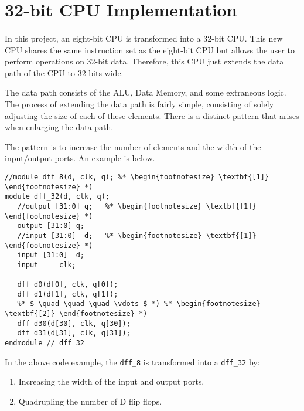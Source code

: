 \documentclass[11pt,letterpaper,final]{article}
\begin{document}
\section{ 32-bit CPU Implementation }
\paragraph{}
In this project, an eight-bit CPU is transformed into a 32-bit CPU. This new CPU
shares the same instruction set as the eight-bit CPU but allows the user to 
perform operations on 32-bit data.  Therefore, this CPU just extends the data 
path of the CPU to 32 bits wide.

The data path consists of the ALU, Data Memory, and some extraneous logic.  The 
process of extending the data path is fairly simple, consisting of solely 
adjusting the size of each of these elements.  There is a distinct pattern that 
arises when enlarging the data path. 

The pattern is to increase the number of elements and the width of the input/output 
ports. An example is below.
\begin{center}
\begin{lstlisting}
//module dff_8(d, clk, q); %* \begin{footnotesize} \textbf{[1]} \end{footnotesize} *)
module dff_32(d, clk, q);
   //output [31:0] q;   %* \begin{footnotesize} \textbf{[1]} \end{footnotesize} *)
   output [31:0] q;
   //input [31:0]  d;   %* \begin{footnotesize} \textbf{[1]} \end{footnotesize} *)
   input [31:0]  d;
   input 	 clk;	
   
   dff d0(d[0], clk, q[0]);
   dff d1(d[1], clk, q[1]);
   %* $ \quad \quad \quad \vdots $ *) %* \begin{footnotesize} \textbf{[2]} \end{footnotesize} *) 
   dff d30(d[30], clk, q[30]);
   dff d31(d[31], clk, q[31]);
endmodule // dff_32
\end{lstlisting}
\end{center}

In the above code example, the \verb|dff_8| is transformed into a \verb|dff_32|
by:
\begin{enumerate}
  \item Increasing the width of the input and output ports.
  \item Quadrupling the number of D flip flops.
\end{enumerate}
\end{document}
